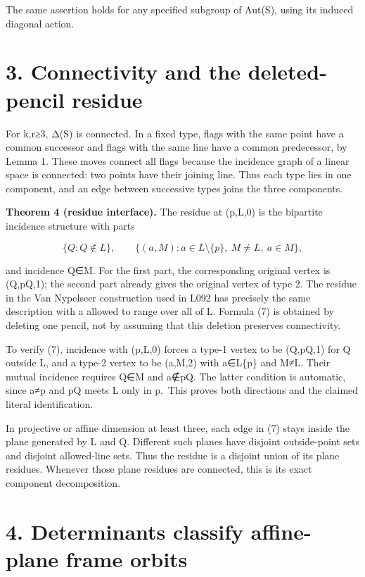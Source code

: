 \documentclass[
  11pt,
  a4paper,
]{article}
\begin{document}
The same assertion holds for any specified subgroup of Aut(S), using its
induced diagonal action.

\section{3. Connectivity and the deleted-pencil
residue}\label{connectivity-and-the-deleted-pencil-residue}

For k,r≥3, Δ(S) is connected. In a fixed type, flags with the same point
have a common successor and flags with the same line have a common
predecessor, by Lemma 1. These moves connect all flags because the
incidence graph of a linear space is connected: two points have their
joining line. Thus each type lies in one component, and an edge between
successive types joins the three components.

\textbf{Theorem 4 (residue interface).} The residue at (p,L,0) is the
bipartite incidence structure with parts

\[
 \{Q:Q\notin L\},\qquad
 \{(a,M):a\in L\setminus\{p\},\ M\ne L,\ a\in M\},
\tag{7}
\]

and incidence Q∈M. For the first part, the corresponding original vertex
is (Q,pQ,1); the second part already gives the original vertex of type
2. The residue in the Van Nypelseer construction used in L092 has
precisely the same description with a allowed to range over all of L.
Formula (7) is obtained by deleting one pencil, not by assuming that
this deletion preserves connectivity.

To verify (7), incidence with (p,L,0) forces a type-1 vertex to be
(Q,pQ,1) for Q outside L, and a type-2 vertex to be (a,M,2) with
a∈L\{p\} and M≠L. Their mutual incidence requires Q∈M and a∉pQ. The
latter condition is automatic, since a≠p and pQ meets L only in p.~This
proves both directions and the claimed literal identification.

In projective or affine dimension at least three, each edge in (7) stays
inside the plane generated by L and Q. Different such planes have
disjoint outside-point sets and disjoint allowed-line sets. Thus the
residue is a disjoint union of its plane residues. Whenever those plane
residues are connected, this is its exact component decomposition.

\section{4. Determinants classify affine-plane frame
orbits}\label{determinants-classify-affine-plane-frame-orbits}
\end{document}
